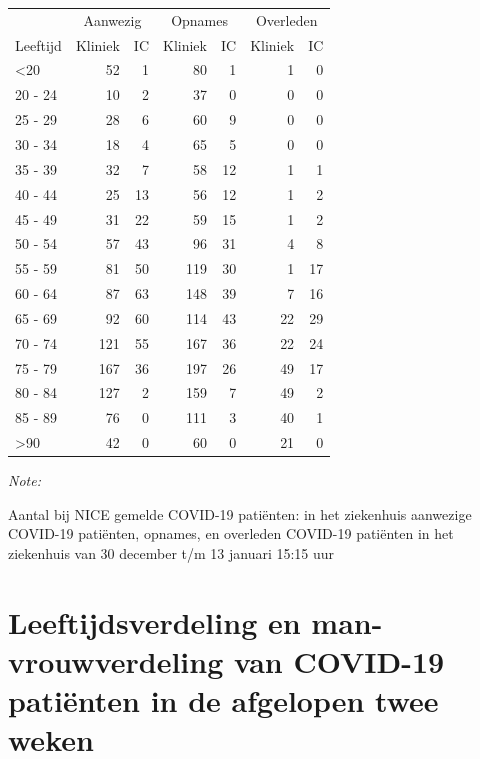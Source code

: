 \documentclass[
  english,
  man,floatsintext]{apa6}
\begin{document}
\begin{table}
\centering\begingroup\fontsize{10}{12}\selectfont

\begin{threeparttable}
\begin{tabular}{lrrrrrr}
\toprule
\multicolumn{1}{c}{ } & \multicolumn{2}{c}{Aanwezig} & \multicolumn{2}{c}{Opnames} & \multicolumn{2}{c}{Overleden} \\
\cmidrule(l{3pt}r{3pt}){2-3} \cmidrule(l{3pt}r{3pt}){4-5} \cmidrule(l{3pt}r{3pt}){6-7}
Leeftijd & Kliniek & IC & Kliniek & IC & Kliniek & IC\\
\midrule
<20 & 52 & 1 & 80 & 1 & 1 & 0\\
20 - 24 & 10 & 2 & 37 & 0 & 0 & 0\\
25 - 29 & 28 & 6 & 60 & 9 & 0 & 0\\
30 - 34 & 18 & 4 & 65 & 5 & 0 & 0\\
35 - 39 & 32 & 7 & 58 & 12 & 1 & 1\\
40 - 44 & 25 & 13 & 56 & 12 & 1 & 2\\
45 - 49 & 31 & 22 & 59 & 15 & 1 & 2\\
50 - 54 & 57 & 43 & 96 & 31 & 4 & 8\\
55 - 59 & 81 & 50 & 119 & 30 & 1 & 17\\
60 - 64 & 87 & 63 & 148 & 39 & 7 & 16\\
65 - 69 & 92 & 60 & 114 & 43 & 22 & 29\\
70 - 74 & 121 & 55 & 167 & 36 & 22 & 24\\
75 - 79 & 167 & 36 & 197 & 26 & 49 & 17\\
80 - 84 & 127 & 2 & 159 & 7 & 49 & 2\\
85 - 89 & 76 & 0 & 111 & 3 & 40 & 1\\
>90 & 42 & 0 & 60 & 0 & 21 & 0\\
\bottomrule
\end{tabular}
\begin{tablenotes}
\item \textit{Note: } 
\item Aantal bij NICE gemelde COVID-19 patiënten: in het ziekenhuis aanwezige COVID-19 patiënten, opnames, en overleden COVID-19 patiënten in het ziekenhuis van 30 december t/m 13 januari 15:15 uur
\end{tablenotes}
\end{threeparttable}
\endgroup{}
\end{table}

\newpage

\hypertarget{leeftijdsverdeling-en-man-vrouwverdeling-van-covid-19-patiuxebnten-in-de-afgelopen-twee-weken}{%
\section{Leeftijdsverdeling en man-vrouwverdeling van COVID-19 patiënten in de afgelopen twee weken}\label{leeftijdsverdeling-en-man-vrouwverdeling-van-covid-19-patiuxebnten-in-de-afgelopen-twee-weken}}
\end{document}
